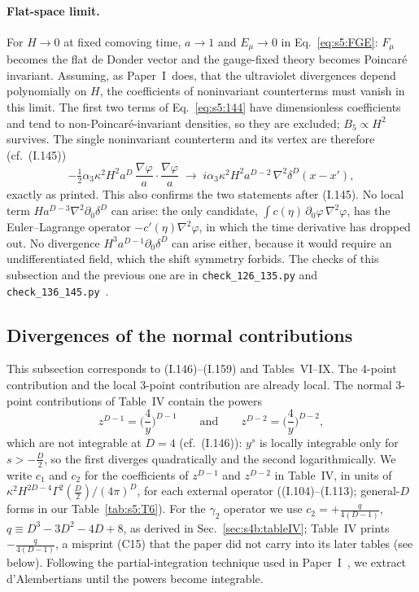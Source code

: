 \documentclass[aps,prd,onecolumn,10pt,nofootinbib,floatfix]{revtex4-2}
\newcommand{\PI}{Paper~I}
\newcommand{\eqI}[1]{(I.#1)}
\begin{document}
\paragraph*{Flat-space limit.}
For $H\to0$ at fixed comoving time, $a\to1$ and $E_\mu\to0$ in Eq.~\eqref{eq:s5:FGE}: $F_\mu$ becomes the flat de Donder vector and the gauge-fixed theory becomes Poincar\'e invariant.
Assuming, as \PI\ does, that the ultraviolet divergences depend polynomially on $H$, the coefficients of noninvariant counterterms must vanish in this limit.
The first two terms of Eq.~\eqref{eq:s5:144} have dimensionless coefficients and tend to non-Poincar\'e-invariant densities, so they are excluded; $B_5\propto H^2$ survives.
The single noninvariant counterterm and its vertex are therefore (cf.\ \eqI{145})
\begin{equation}
-\tfrac12\alpha_3\kappa^2H^2a^D\,\frac{\nabla\varphi}{a}\cdot\frac{\nabla\varphi}{a}\;\longrightarrow\;i\alpha_3\kappa^2H^2a^{D-2}\,\nabla^2\delta^D(x-x'),
\label{eq:s5:145}
\end{equation}
exactly as printed.
This also confirms the two statements after \eqI{145}.
No local term $Ha^{D-3}\nabla^2\partial_0\delta^D$ can arise: the only candidate, $\int c(\eta)\,\partial_0\varphi\,\nabla^2\varphi$, has the Euler--Lagrange operator $-c'(\eta)\nabla^2\varphi$, in which the time derivative has dropped out.
No divergence $H^3a^{D-1}\partial_0\delta^D$ can arise either, because it would require an undifferentiated field, which the shift symmetry forbids.
The checks of this subsection and the previous one are in \texttt{check\_126\_135.py} and \texttt{check\_136\_145.py}~\cite{ref:repo}.

\subsection{Divergences of the normal contributions}
\label{sec:s5:div}

This subsection corresponds to \eqI{146}--\eqI{159} and Tables~VI--IX.
The 4-point contribution and the local 3-point contribution are already local.
The normal 3-point contributions of Table~IV contain the powers
\begin{equation}
z^{D-1}=\Big(\frac4y\Big)^{D-1}\qquad\text{and}\qquad z^{D-2}=\Big(\frac4y\Big)^{D-2},
\label{eq:s5:146}
\end{equation}
which are not integrable at $D=4$ (cf.\ \eqI{146}): $y^s$ is locally integrable only for $s>-\frac D2$, so the first diverges quadratically and the second logarithmically.
We write $c_1$ and $c_2$ for the coefficients of $z^{D-1}$ and $z^{D-2}$ in Table~IV, in units of $\kappa^2H^{2D-4}\Gamma^2(\frac D2)/(4\pi)^D$, for each external operator (\eqI{104}--\eqI{113}; general-$D$ forms in our Table~\ref{tab:s5:T6}).
For the $\gamma_2$ operator we use $c_2=+\frac{q}{4(D-1)}$, $q\equiv D^3-3D^2-4D+8$, as derived in Sec.~\ref{sec:s4b:tableIV}; Table~IV prints $-\frac{q}{4(D-1)}$, a misprint (C15) that the paper did not carry into its later tables (see below).
Following the partial-integration technique used in \PI~\cite{ref:Onemli2002}, we extract d'Alembertians until the powers become integrable.
\end{document}
